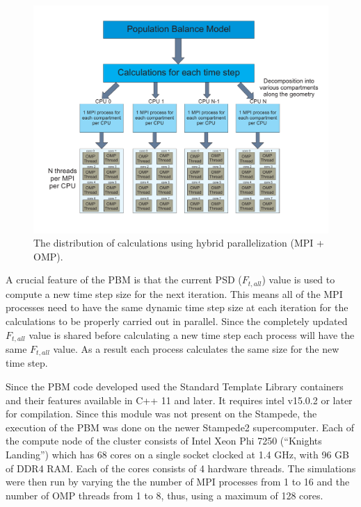 \documentclass[preprint,11pt,authoryear]{elsarticle}
\begin{document}
\begin{figure}[H]
\centering
\includegraphics[scale=0.5]{PBM_decomposition.pdf}
\caption{The distribution of calculations using hybrid parallelization (MPI + OMP).}
\label{fig:mthds_PBM_decompostion}
\end{figure}

A crucial feature of the PBM is that the current PSD ($F_{t,all}$) value is used to compute a new 
time step size for the next iteration. This means all of the MPI processes need to have the same 
dynamic time step size at each iteration for the calculations to be properly carried out in parallel. Since 
the completely updated $F_{t,all}$ value is shared before calculating a new time step each process will 
have the same $F_{t,all}$ value. As a result each process calculates the same size for the new time 
step. 

Since the PBM code developed used the Standard Template Library containers and their features available in C++ 11 and later. It requires intel v15.0.2 or
later for compilation. Since this module was not present on the Stampede, the execution of the PBM was done on
the newer Stampede2 supercomputer. Each of the compute node of the cluster consists of Intel Xeon Phi 7250 
(\textquotedblleft Knights Landing\textquotedblright) which has 68 cores on a single socket clocked at 1.4 GHz, with 96 GB of DDR4 RAM. Each of 
the cores consists of 4 hardware threads. The simulations were then run by varying the the number of MPI 
processes from 1 to 16 and the number of OMP threads from 1 to 8, thus, using a maximum of 128 cores.
\end{document}
